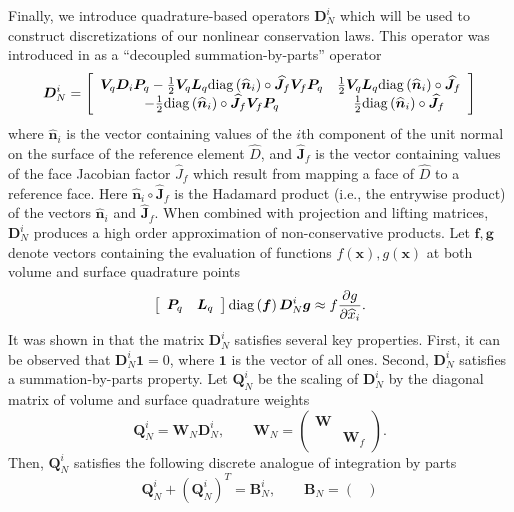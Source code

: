 \documentclass[preprint,10pt]{article}
\theoremstyle{definition}
\theoremstyle{lemma}
\theoremstyle{theorem}
\theoremstyle{assumption}
\renewcommand{\hat}{\widehat}
\newcommand{\pd}[2]{\frac{\partial#1}{\partial#2}}
\newcommand{\LRp}[1]{\left( #1 \right)}
\newcommand{\LRs}[1]{\left[ #1 \right]}
\newcommand{\diag}[1]{{\rm diag}\LRp{#1}}
\begin{document}
{Finally, we introduce quadrature-based operators $\bm{D}_N^i$ which will be used to construct discretizations of our nonlinear conservation laws.  This operator was introduced in \cite{chan2017discretely} as a ``decoupled summation-by-parts'' operator
\begin{equation}
\bm{D}_N^i =\LRs{
\begin{array}{cc}
\bm{V}_q\bm{D}_i \bm{P}_q - \frac{1}{2}\bm{V}_q\bm{L}_q \diag{\hat{\bm{n}}_i}\circ\bm{\hat{J}}_f\bm{V}_f\bm{P}_q & \frac{1}{2}\bm{V}_q\bm{L}_q  \diag{\hat{\bm{n}}_i}\circ\bm{\hat{J}}_f\\
- \frac{1}{2}\diag{\hat{\bm{n}}_i}\circ\bm{\hat{J}}_f \bm{V}_f\bm{P}_q &  \frac{1}{2}\diag{\hat{\bm{n}}_i}\circ\bm{\hat{J}}_f
\end{array}
}
\label{eq:decoupledsbp}
\end{equation}
where $\hat{\bm{n}}_i$ is the vector containing values of the $i$th component of the unit normal on the surface of the reference element $\hat{D}$, and $\bm{\hat{J}}_f$ is the vector containing values of the face Jacobian factor $\hat{J}_f$ which result from mapping a face of $\hat{D}$ to a reference face.  Here $\hat{\bm{n}}_i\circ\bm{\hat{J}}_f$ is the Hadamard product (i.e., the entrywise product) of the vectors $\hat{\bm{n}}_i$ and $\bm{\hat{J}}_f$.  When combined with projection and lifting matrices, $\bm{D}_N^i$ produces a high order approximation of non-conservative products.  Let $\bm{f},\bm{g}$ denote vectors containing the evaluation of functions $f(\bm{x}),g(\bm{x})$ at both volume and surface quadrature points
\[
\LRs{\begin{array}{cc}\bm{P}_q & \bm{L}_q\end{array}} \diag{\bm{f}}\bm{D}_N^i \bm{g} \approx f\pd{g}{\hat{x}_i}.
\]
It was shown in \cite{chan2017discretely} that the matrix $\bm{D}_N^i$ satisfies several key properties.  First, it can be observed that $\bm{D}_N^i\bm{1} = 0$, where $\bm{1}$ is the vector of all ones.  Second, $\bm{D}_N^i$ satisfies a summation-by-parts property.  Let $\bm{Q}_N^i$ be the scaling of $\bm{D}_N^i$ by the diagonal matrix of volume and surface quadrature weights 
\[
\bm{Q}_N^i = \bm{W}_N \bm{D}_N^i, \qquad \bm{W}_N = \LRp{\begin{array}{cc}
\bm{W} &\\
& \bm{W}_f 
\end{array}}.
\]
Then, $\bm{Q}_N^i$ satisfies the following discrete analogue of integration by parts 
\begin{equation}
\bm{Q}_N^i + \LRp{\bm{Q}_N^i}^T = \bm{B}^i_N, \qquad \bm{B}_N = \LRp{\begin{array}{cc}

\end{array}}
\end{equation}}
\end{document}
